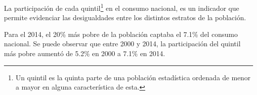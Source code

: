 La participación de cada quintil\footnote{Un quintil es la quinta parte de una población estadística ordenada de menor a mayor en alguna característica de esta.}  en el consumo nacional, es un indicador que permite evidenciar las  desigualdades entre los distintos estratos de la población. 

Para el 2014, el 20\% más  pobre de la población captaba el 7.1\% del consumo nacional. Se puede observar que entre 2000 y 2014, la participación del quintil más pobre aumentó de 5.2\% en 2000 a 7.1\%  en 2014.